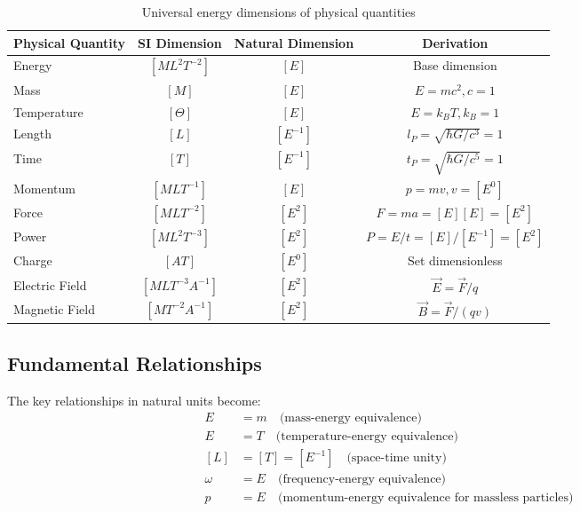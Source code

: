 \documentclass[11pt,a4paper]{article}
\begin{document}
	\begin{table}[htbp]
		\centering
		\begin{adjustbox}{width=0.9\textwidth}
			\begin{tabular}{lccc}
				\toprule
				\textbf{Physical Quantity} & \textbf{SI Dimension} & \textbf{Natural Dimension} & \textbf{Derivation} \\
				\midrule
				Energy & $[ML^2T^{-2}]$ & $[E]$ & Base dimension \\
				Mass & $[M]$ & $[E]$ & $E = mc^2, c = 1$ \\
				Temperature & $[\Theta]$ & $[E]$ & $E = k_BT, k_B = 1$ \\
				Length & $[L]$ & $[E^{-1}]$ & $l_P = \sqrt{\hbar G/c^3} = 1$ \\
				Time & $[T]$ & $[E^{-1}]$ & $t_P = \sqrt{\hbar G/c^5} = 1$ \\
				Momentum & $[MLT^{-1}]$ & $[E]$ & $p = mv, v = [E^0]$ \\
				Force & $[MLT^{-2}]$ & $[E^2]$ & $F = ma = [E][E] = [E^2]$ \\
				Power & $[ML^2T^{-3}]$ & $[E^2]$ & $P = E/t = [E]/[E^{-1}] = [E^2]$ \\
				Charge & $[AT]$ & $[E^0]$ & Set dimensionless \\
				Electric Field & $[MLT^{-3}A^{-1}]$ & $[E^2]$ & $\vec{E} = \vec{F}/q$ \\
				Magnetic Field & $[MT^{-2}A^{-1}]$ & $[E^2]$ & $\vec{B} = \vec{F}/(qv)$ \\
				\bottomrule
			\end{tabular}
		\end{adjustbox}
		\caption{Universal energy dimensions of physical quantities}
		\label{tab:energy_dimensions}
	\end{table}
	
	\subsection{Fundamental Relationships}
	
	The key relationships in natural units become:
	\begin{align}
		E &= m \quad \text{(mass-energy equivalence)} \\
		E &= T \quad \text{(temperature-energy equivalence)} \\
		[L] &= [T] = [E^{-1}] \quad \text{(space-time unity)} \\
		\omega &= E \quad \text{(frequency-energy equivalence)} \\
		p &= E \quad \text{(momentum-energy equivalence for massless particles)}
	\end{align}
	
\end{document}
